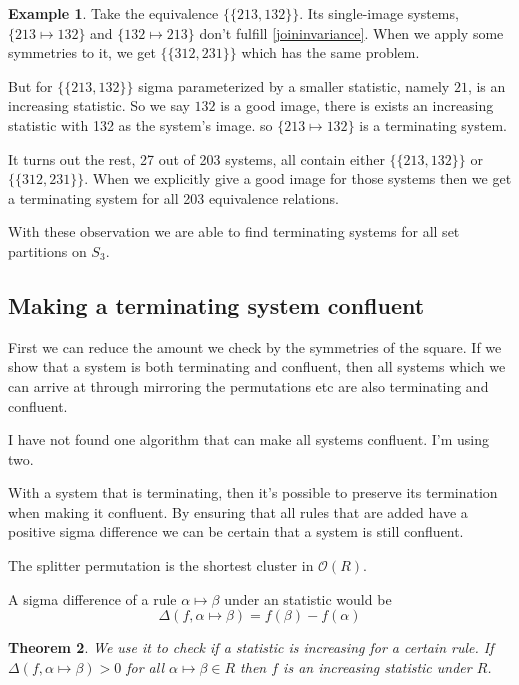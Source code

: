 \documentclass[openany, a4paper, 11pt, english]{article}
\newcommand{\patternrule}{ \mapsto \!}
\newtheorem{theorem}{Theorem}[section]
\theoremstyle{definition}
\newtheorem{example}[theorem]{Example}
\newcommand{\Sym}{S}
\newcommand{\Ocal}{\mathcal{O}}
\begin{document}
\begin{example}
    Take the equivalence $\{ \{ 213, 132 \} \}$. Its single-image systems,
    ${\{ 213 \patternrule 132 \}}$ and ${\{ 132 \patternrule 213 \}}$
    don't fulfill \eqref{joininvariance}.
    When we apply some symmetries to it, we get $\{ \{ 312, 231 \} \}$ which has the same problem.

    But for $\{ \{ 213, 132 \} \}$ sigma parameterized by a smaller statistic, namely $21$, is an
    increasing statistic. So we say $132$ is a good image, there is exists an
    increasing statistic with 132 as the system's image.
    so $\{ 213 \patternrule 132 \}$ is a terminating system.
\end{example}

It turns out the rest, 27 out of 203 systems, all contain either $\{ \{ 213, 132
\} \}$ or $\{ \{ 312, 231 \} \}$. When we explicitly give a good image for those
systems then we get a terminating system for all 203 equivalence relations.

With these observation we are able to find terminating systems for all set
partitions on $\Sym_3$.

\subsection{Making a terminating system confluent}
First we can reduce the amount we check by the symmetries of the square.
If we show that a system is both terminating and confluent, then all systems
which we can arrive at through mirroring the permutations etc are also
terminating and confluent.

I have not found one algorithm that can make all systems confluent.
I'm using two.

With a system that is terminating, then it's possible to preserve its
termination when making it confluent.
By ensuring that all rules that are added have a positive sigma difference
we can be certain that a system is still confluent. 

The splitter permutation is the shortest cluster in $\Ocal(R)$.

A sigma difference of a rule $\alpha \patternrule \beta$ under an 
statistic would be
\[
    \Delta(f, \alpha \patternrule \beta) = f(\beta) - f(\alpha)
\]

\begin{theorem}
We use it to check if a statistic is increasing for a certain rule.
If $\Delta(f, \alpha \patternrule \beta) > 0$ for all $\alpha \patternrule \beta
\in R$ then $f$ is an increasing statistic under $R$.
\end{theorem}
\end{document}
